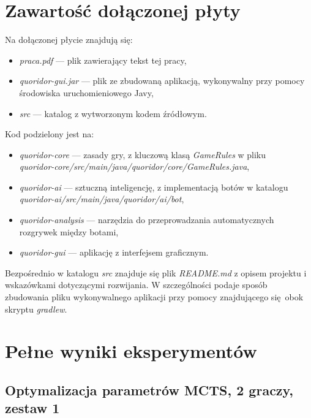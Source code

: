 \documentclass{pracamgr}
\begin{document}
\begin{appendices}

    \chapter{Zawartość dołączonej płyty \label{code}}

    Na dołączonej płycie znajdują się:
\begin{itemize}
    \item \textit{praca.pdf} --- plik zawierający tekst tej pracy,
    \item \textit{quoridor-gui.jar} --- plik ze zbudowaną aplikacją, wykonywalny przy pomocy środowiska uruchomieniowego Javy,
    \item \textit{src} --- katalog z wytworzonym kodem źródłowym.
\end{itemize}

Kod podzielony jest na:

\begin{itemize}
    \item \textit{quoridor-core} --- zasady gry, z kluczową klasą \textit{GameRules} w pliku \\ \textit{quoridor-core/src/main/java/quoridor/core/GameRules.java},
    \item \textit{quoridor-ai} --- sztuczną inteligencję, z implementacją botów w katalogu \\ \textit{quoridor-ai/src/main/java/quoridor/ai/bot},
    \item \textit{quoridor-analysis} --- narzędzia do przeprowadzania automatycznych rozgrywek między botami,
    \item \textit{quoridor-gui} --- aplikację z interfejsem graficznym.
\end{itemize}

    Bezpośrednio w katalogu \textit{src} znajduje się plik \textit{README.md} z opisem projektu i wskazówkami dotyczącymi rozwijania.
    W szczególności podaje sposób zbudowania pliku wykonywalnego aplikacji przy pomocy znajdującego się obok skryptu \textit{gradlew}.

\chapter{Pełne wyniki eksperymentów}

\section{Optymalizacja parametrów MCTS, 2 graczy, zestaw 1\label{results-1-2p}}


\end{appendices}
\end{document}
